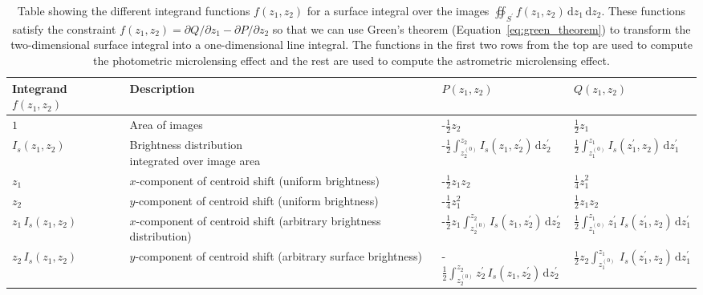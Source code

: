 \documentclass[12pt,dvipsnames]{report}
\newcommand{\ud}{\,\mathrm{d}}
\begin{document}
\begin{table}[h!]
\centering
\begin{tabular}{l l l l} 
 \toprule
\shortstack[l]{Integrand\\$f(z_1, z_2)$} & Description & $P(z_1,z_2)$ & $Q(z_1,z_2)$\\
 \midrule
$1$ & Area of images& -$\frac{1}{2}z_2$ &  $\frac{1}{2}z_1$ \\[0.5cm]
$I_s(z_1, z_2)$ &\shortstack[l]{Brightness distribution\\integrated over image area}& -$\frac{1}{2} \int_{z_2^{(0)}}^{z_2} I_s\left(z_1, z_2^{\prime}\right) \ud z_2^{\prime}$ & $\frac{1}{2} \int_{z_1^{(0)}}^{z_1} I_s\left(z_1^{\prime}, z_2\right) \ud z_1^{\prime}$\\[0.5cm]
$z_1$ & \shortstack[l]{$x$-component of centroid shift\\(uniform brightness)}& -$\frac{1}{2}z_1z_2$ & $\frac{1}{4}z_1^2$\\[0.5cm]
$z_2$ & \shortstack[l]{$y$-component of centroid shift\\(uniform brightness)}&  -$\frac{1}{4}z_1^2$ & $\frac{1}{2}z_1z_2$\\[0.5cm]
$z_1\,I_s(z_1, z_2)$ & \shortstack[l]{$x$-component of centroid shift\\(arbitrary brightness distribution)}& -$\frac{1}{2} z_1\int_{z_2^{(0)}}^{z_2} I_s\left(z_1, z_2^{\prime}\right) \ud z_2^{\prime}$ & $\frac{1}{2} \int_{z_1^{(0)}}^{z_1} z_1^\prime\,I_s\left(z_1^{\prime}, z_2\right) \ud z_1^{\prime}$\\[0.5cm]
$z_2\,I_s(z_1, z_2)$ & \shortstack[l]{$y$-component of centroid shift\\(arbitrary surface brightness)}& -$\frac{1}{2} \int_{z_2^{(0)}}^{z_2} z_2^\prime\,I_s\left(z_1, z_2^{\prime}\right) \ud z_2^{\prime}$ & $\frac{1}{2} z_2\int_{z_1^{(0)}}^{z_1} \,I_s\left(z_1^{\prime}, z_2\right) \ud z_1^{\prime}$\\[0.5cm]
\bottomrule
\end{tabular}
\caption{Table showing the different integrand functions $f(z_1, z_2)$ 
for a surface integral over the images $\oiint_{{S}^\prime}f(z_1,z_2)\ud z_1\ud z_2$.
These functions satisfy the constraint 
$f(z_1, z_2) = \partial Q/\partial z_1 - \partial P/\partial z_2$ so that 
we can use Green's theorem (Equation~\ref{eq:green_theorem}) to transform the two-dimensional
surface integral into a one-dimensional line integral. The functions in the first two rows 
from the top are used to compute the photometric microlensing effect and the rest 
are used to compute the astrometric microlensing effect.}
\label{tab:p_and_q_functions}
\end{table}
\end{document}
